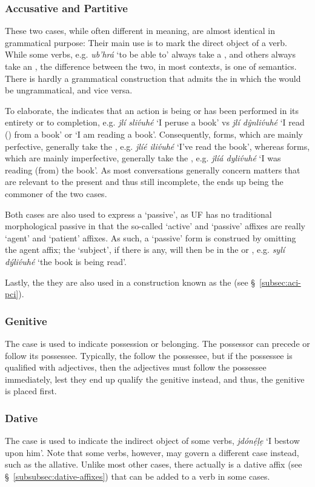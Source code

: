 \documentclass[a4paper, 12pt, twoside, final]{article}
\let \w \textit
\begin{document}
\subsubsection{Accusative and Partitive}
These two cases, while often different in meaning, are almost identical in grammatical purpose: Their main use is to
mark the direct object of a verb. While some verbs, e.g. \w{ub’hrá} ‘to be
able to’ always take a , and others always take an , the difference between the two, in most contexts,
is one of semantics. There is hardly a grammatical construction that admits the  in which the  would be
ungrammatical, and vice versa.

To elaborate, the  indicates that an action is being or has been performed in its entirety or to completion, e.g.
\w{jlí sliv́uhé} ‘I peruse a book’ vs \w{jlí dŷnliv́uhé} ‘I read () from a book’ or ‘I am reading a book’. Consequently,
 forms, which are mainly perfective, generally take the , e.g. \w{jlíé iliv́uhé} ‘I’ve read the book’,
whereas  forms, which are mainly imperfective, generally take the , e.g. \w{jlíá dyliv́uhé} ‘I was reading
(from) the book’. As most conversations generally concern matters that are relevant to the present and thus still incomplete,
the  ends up being the commoner of the two cases.

Both cases are also used to express a ‘passive’, as UF has no traditional morphological passive in that the so-called
‘active’ and ‘passive’ affixes are really ‘agent’ and ‘patient’ affixes. As such, a ‘passive’ form is construed by
omitting the agent affix; the ‘subject’, if there is any, will then be in the  or , e.g. \w{sylí dýliv́uhé}
‘the book is being read’.

Lastly, the they are also used in a construction known as the  (see §~\ref{subsec:aci-pci}).

\subsubsection{Genitive}
The  case is used to indicate possession or belonging. The possessor can precede or follow its possessee. Typically,
the  follow the possessee, but if the possessee is qualified with adjectives, then the adjectives must follow the
possessee immediately, lest they end up qualify the genitive instead, and thus, the genitive is placed first.

\subsubsection{Dative}
The  case is used to indicate the indirect object of some verbs, \w{jdónẹ́ḷẹ} ‘I bestow upon him’. Note that some
verbs, however, may govern a different case instead, such as the allative. Unlike most other cases, there actually is
a dative affix (see §~\ref{subsubsec:dative-affixes}) that can be added to a verb in some cases.
\end{document}

